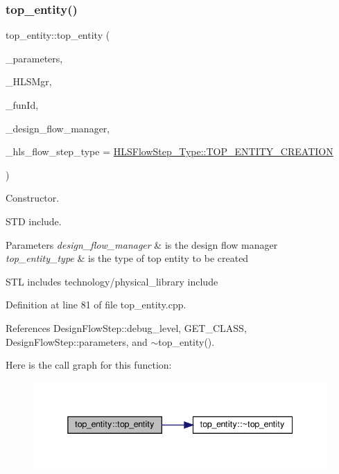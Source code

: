 \subsubsection{\texorpdfstring{top\+\_\+entity()}{top\_entity()}}
{\footnotesize\ttfamily top\+\_\+entity\+::top\+\_\+entity (\begin{DoxyParamCaption}\item[{const \hyperlink{Parameter_8hpp_a37841774a6fcb479b597fdf8955eb4ea}{Parameter\+Const\+Ref}}]{\+\_\+parameters,  }\item[{const \hyperlink{hls__manager_8hpp_acd3842b8589fe52c08fc0b2fcc813bfe}{H\+L\+S\+\_\+manager\+Ref}}]{\+\_\+\+H\+L\+S\+Mgr,  }\item[{unsigned int}]{\+\_\+fun\+Id,  }\item[{const Design\+Flow\+Manager\+Const\+Ref}]{\+\_\+design\+\_\+flow\+\_\+manager,  }\item[{const \hyperlink{hls__step_8hpp_ada16bc22905016180e26fc7e39537f8d}{H\+L\+S\+Flow\+Step\+\_\+\+Type}}]{\+\_\+hls\+\_\+flow\+\_\+step\+\_\+type = {\ttfamily \hyperlink{hls__step_8hpp_ada16bc22905016180e26fc7e39537f8da7ad3d91f561dccd4c3beff4860b7f848}{H\+L\+S\+Flow\+Step\+\_\+\+Type\+::\+T\+O\+P\+\_\+\+E\+N\+T\+I\+T\+Y\+\_\+\+C\+R\+E\+A\+T\+I\+ON}} }\end{DoxyParamCaption})}



Constructor. 

S\+TD include.


\begin{DoxyParams}{Parameters}
{\em design\+\_\+flow\+\_\+manager} & is the design flow manager \\
\hline
{\em top\+\_\+entity\+\_\+type} & is the type of top entity to be created\\
\hline
\end{DoxyParams}
S\+TL includes technology/physical\+\_\+library include 

Definition at line 81 of file top\+\_\+entity.\+cpp.



References Design\+Flow\+Step\+::debug\+\_\+level, G\+E\+T\+\_\+\+C\+L\+A\+SS, Design\+Flow\+Step\+::parameters, and $\sim$top\+\_\+entity().

Here is the call graph for this function\+:
\nopagebreak
\begin{figure}[H]
\begin{center}
\leavevmode
\includegraphics[width=338pt]{d0/d0e/classtop__entity_adc1d91ea0660baba3b103fbe053b0d30_cgraph}
\end{center}
\end{figure}
\mbox{\label{classtop__entity_a5a61bc3f8b01888887203ce9408eaddf}} 

